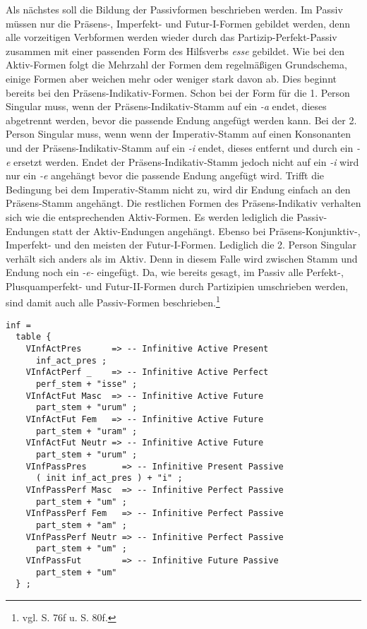 Als nächstes soll die Bildung der Passivformen beschrieben werden. Im Passiv müssen nur die Präsens-, Imperfekt- und Futur-I-Formen gebildet werden, denn alle vorzeitigen Verbformen werden wieder durch das Partizip-Perfekt-Passiv zusammen mit einer passenden Form des Hilfsverbs \textit{esse} gebildet. Wie bei den Aktiv-Formen folgt die Mehrzahl der Formen dem regelmäßigen Grundschema, einige Formen aber weichen mehr oder weniger stark davon ab. Dies beginnt bereits bei den Präsens-Indikativ-Formen. Schon bei der Form für die 1. Person Singular muss, wenn der Präsens-Indikativ-Stamm auf ein \textit{-a} endet, dieses abgetrennt werden, bevor die passende Endung angefügt werden kann. Bei der 2. Person Singular muss, wenn wenn der Imperativ-Stamm auf einen Konsonanten und der Präsens-Indikativ-Stamm auf ein \textit{-i} endet, dieses entfernt und durch ein \textit{-e} ersetzt werden. Endet der Präsens-Indikativ-Stamm jedoch nicht auf ein \textit{-i} wird nur ein \textit{-e} angehängt bevor die passende Endung angefügt wird. Trifft die Bedingung bei dem Imperativ-Stamm nicht zu, wird dir Endung einfach an den Präsens-Stamm angehängt. Die restlichen Formen des Präsens-Indikativ verhalten sich wie die entsprechenden Aktiv-Formen. Es werden lediglich die Passiv-Endungen statt der Aktiv-Endungen angehängt. Ebenso bei Präsens-Konjunktiv-, Imperfekt- und den meisten der Futur-I-Formen. Lediglich die 2. Person Singular verhält sich anders als im Aktiv. Denn in diesem Falle wird zwischen Stamm und Endung noch ein \textit{-e-} eingefügt. Da, wie bereits gesagt, im Passiv alle Perfekt-, Plusquamperfekt- und Futur-II-Formen durch Partizipien umschrieben werden, sind damit auch alle Passiv-Formen beschrieben.\footnote{vgl. \cite{BAYER-LINDAUER1994} S. 76f u. S. 80f.} \par
\begin{lstlisting}[float=h!tp,caption={Ausschnitt aus der Funktion \texttt{mkVerb} um Infinitiv-Verbformen zu bilden (vgl. \textbf{ResLat.gf})},label={GF-Res-MkVerb-Inf},basicstyle=\small]
inf = 
  table {
    VInfActPres      => -- Infinitive Active Present
      inf_act_pres ;
    VInfActPerf _    => -- Infinitive Active Perfect
      perf_stem + "isse" ;
    VInfActFut Masc  => -- Infinitive Active Future
      part_stem + "urum" ;
    VInfActFut Fem   => -- Infinitive Active Future
      part_stem + "uram" ; 
    VInfActFut Neutr => -- Infinitive Active Future
      part_stem + "urum" ;
    VInfPassPres       => -- Infinitive Present Passive
      ( init inf_act_pres ) + "i" ;
    VInfPassPerf Masc  => -- Infinitive Perfect Passive
      part_stem + "um" ;
    VInfPassPerf Fem   => -- Infinitive Perfect Passive
      part_stem + "am" ;
    VInfPassPerf Neutr => -- Infinitive Perfect Passive
      part_stem + "um" ;
    VInfPassFut        => -- Infinitive Future Passive
      part_stem + "um"
  } ;
\end{lstlisting}
